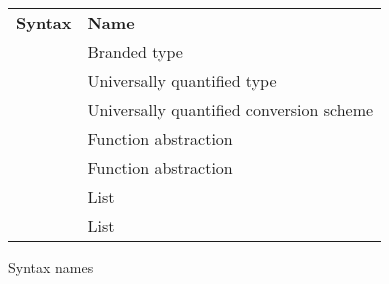\begin{figure}[p]
\centering
\begin{tabular}{rl}

\textbf{Syntax} & \textbf{Name} \\

\csbrand{\varbrand}{\varty} & Branded type \\
\tyfor{\tyvar}{\varty} & Universally quantified type \\
\csfor{\csvar}{\varcs} & Universally quantified conversion scheme \\
\tyfun{\varty}{\varty} & Function abstraction \\
\csfun{\varcs}{\varcs} & Function abstraction \\
\tylist{\varty} & List \\
\cslist{\varcs} & List \\

\end{tabular}
\caption{Syntax names}
\label{figsyntax2}
\end{figure}
